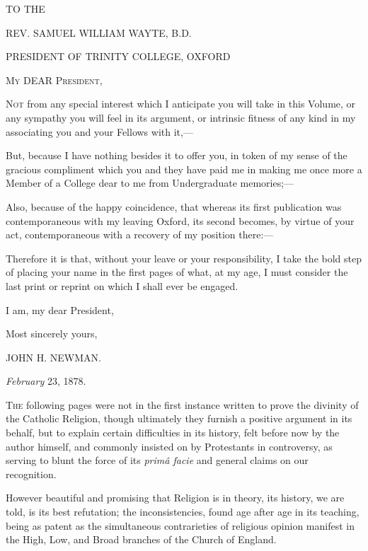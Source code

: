 



TO THE

REV. SAMUEL WILLIAM WAYTE, B.D.

PRESIDENT OF TRINITY COLLEGE, OXFORD


M\textsc{y} DEAR P\textsc{resident},

N\textsc{ot} from any special interest which I anticipate you
will take in this Volume, or any sympathy you will feel
in its argument, or intrinsic fitness of any kind in my
associating you and your Fellows with it,—


But, because I have nothing besides it to offer you,
in token of my sense of the gracious compliment which you
and they have paid me in making me once more a Member of
a College dear to me from Undergraduate memories;—


Also, because of the happy coincidence, that whereas
its first publication was contemporaneous with my leaving
Oxford, its second becomes, by virtue of your act,
contemporaneous with a recovery of my position there:—

Therefore it is that, without your leave or your
responsibility, I take the bold step of placing your name
in the first pages of what, at my age, I must consider
the last print or reprint on which I shall ever be
engaged.


I am, my dear President,

Most sincerely yours,

JOHN H. NEWMAN.

\emph{
February} 23, 1878.








T\textsc{he} following pages were not in the first instance
written to prove the divinity of the Catholic Religion,
though ultimately they furnish a positive argument in its
behalf, but to explain certain difficulties in its
history, felt before now by the author himself, and
commonly insisted on by Protestants in controversy, as
serving to blunt the force of its \emph{primâ facie} and
general claims on our recognition.


However beautiful and promising that Religion is in
theory, its history, we are told, is its best refutation;
the inconsistencies, found age after age in its teaching,
being as patent as the simultaneous contrarieties of
religious opinion manifest in the High, Low, and Broad
branches of the Church of England.


